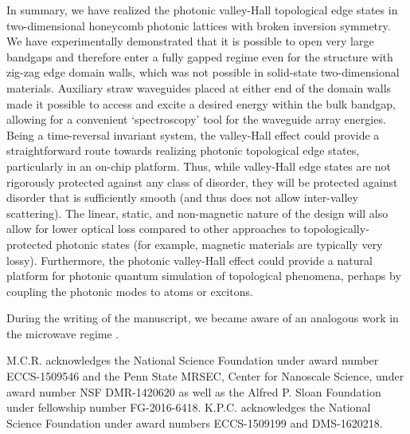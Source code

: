\documentclass[prl,twocolumn,showpacs,amsmath,amssymb,superscriptaddress]{revtex4-1}
\begin{document}
In summary, we have realized the photonic valley-Hall topological edge states in two-dimensional honeycomb photonic lattices with broken inversion symmetry.
We have experimentally demonstrated that it is possible to open very large bandgaps and therefore enter a fully gapped regime even for the structure with zig-zag edge domain walls, which was not possible in solid-state two-dimensional materials.
Auxiliary straw waveguides placed at either end of the domain walls made it possible to access and excite a desired energy within the bulk bandgap, allowing for a convenient `spectroscopy' tool for the waveguide array energies.  Being a time-reversal invariant system, the valley-Hall effect could provide a straightforward route towards realizing photonic topological edge states, particularly in an on-chip platform.  Thus, while valley-Hall edge states are not rigorously protected against any class of disorder, they will be protected against disorder that is sufficiently smooth (and thus does not allow inter-valley scattering).  The linear, static, and non-magnetic nature of the design will also allow for lower optical loss compared to other approaches to topologically-protected photonic states (for example, magnetic materials are typically very lossy).  Furthermore, the photonic valley-Hall effect could provide a natural platform for photonic quantum simulation of topological phenomena, perhaps by coupling the photonic modes to atoms or excitons.

During the writing of the manuscript, we became aware of an analogous work in the microwave regime \cite{Wu2017}.

\begin{acknowledgments}
M.C.R. acknowledges the National Science Foundation under award number ECCS-1509546 and the Penn State MRSEC, Center for Nanoscale Science, under award number NSF DMR-1420620 as well as the Alfred P. Sloan Foundation under fellowship number FG-2016-6418. K.P.C. acknowledges the National Science Foundation under award numbers ECCS-1509199 and DMS-1620218. 
\end{acknowledgments}


\end{document}
